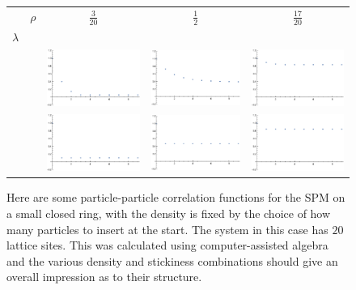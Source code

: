 \begin{figure}[h!]
\caption[Plots of the equal-time particle density correlation function on a ring.]{\label{fig:corrFns} Here are some particle-particle correlation functions for the SPM on a small closed ring,
with the density is fixed by the choice of how many particles to insert at the start. The system in this case has $20$ lattice sites.
This was calculated using computer-assisted algebra and the various density and stickiness combinations should give an overall impression as to their structure.}
\begin{center}
 \begin{tabular}{c  c | c | c | c}
  & $\rho$ & $\frac{3}{20}$ & $\frac{1}{2}$ & $\frac{17}{20}$ \\
  $\lambda$ & & & & \\
 \hline
    \raisebox{3 em}{ $\frac{1}{10}$ } & & \includegraphics[width=0.25\linewidth]{analytics/images/exactCorrFns/lowDensLowL}  & \includegraphics[width=0.25 \linewidth]{analytics/images/exactCorrFns/midDensLowL} & \includegraphics[width=0.25 \linewidth]{analytics/images/exactCorrFns/highDensLowL} \\
    \hline
    \raisebox{3 em}{ $1$ } & &    \includegraphics[width=0.25\linewidth]{analytics/images/exactCorrFns/lowDensMidL}  & \includegraphics[width=0.25 \linewidth]{analytics/images/exactCorrFns/midDensMidL} & \includegraphics[width=0.25 \linewidth]{analytics/images/exactCorrFns/highDensMidL} \\

\end{tabular}
\end{center}
\end{figure}
